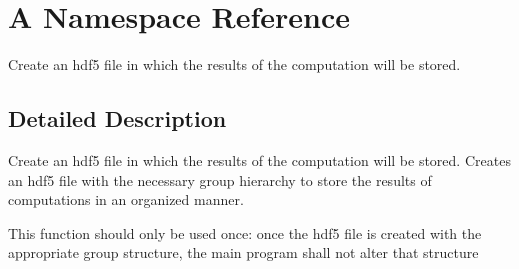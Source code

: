 \hypertarget{namespaceA}{\section{A Namespace Reference}
\label{namespaceA}
}


Create an hdf5 file in which the results of the computation will be stored.  




\subsection{Detailed Description}
Create an hdf5 file in which the results of the computation will be stored. Creates an hdf5 file with the necessary group hierarchy to store the results of computations in an organized manner.

This function should only be used once\-: once the hdf5 file is created with the appropriate group structure, the main program shall not alter that structure 